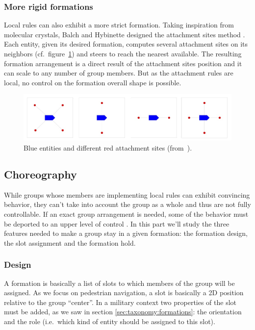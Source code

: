 \documentclass[a4paper,titlepage]{article}
\begin{document}
\subsubsection{More rigid formations}

Local rules can also exhibit a more strict formation. Taking inspiration from molecular crystals, Balch and Hybinette designed the attachment sites method \cite{Balch:2000bn}. Each entity, given its desired formation, computes several attachment sites on its neighbors (cf.\ figure~\ref{fig:attachment_sites}) and steers to reach the nearest available. The resulting formation arrangement is a direct result of the attachment sites position and it can scale to any number of group members. But as the attachment rules are local, no control on the formation overall shape is possible. 

\begin{figure}[h]
\centering
\includegraphics[width=\textwidth]{AttachmentSites.jpg}
\caption{Blue entities and different red attachment sites (from~\cite{Balch:2000bn}).}
\label{fig:attachment_sites}
\end{figure} 

\subsection{Choreography}
\label{sec:stay_grouped:choreography}

While groups whose members are implementing local rules can exhibit convincing behavior, they can’t take into account the group as a whole and thus are not fully controllable. If an exact group arrangement is needed, some of the behavior must be deported to an upper level of control \cite{MusTha2001}. In this part we’ll study the three features needed to make a group stay in a given formation: the formation design, the slot assignment and the formation hold.

\subsubsection{Design}

A formation is basically a list of slots to which members of the group will be assigned. As we focus on pedestrian navigation, a slot is basically a 2D position relative to the group “center”. In a military context two properties of the slot must be added, as we saw in section \ref{sec:taxonomy:formations}: the orientation and the role (i.e.\ which kind of entity should be assigned to this slot).
\end{document}
